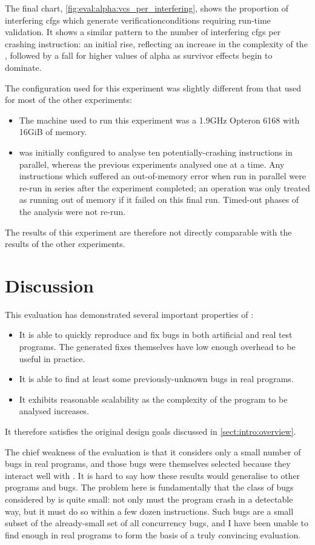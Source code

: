 The final chart, \autoref{fig:eval:alpha:vcs_per_interfering}, shows
the proportion of interfering \glspl{cfg} which generate
\glspl{verificationcondition} requiring run-time validation.  It shows
a similar pattern to the number of interfering \glspl{cfg} per
crashing instruction: an initial rise, reflecting an increase in the
complexity of the {\StateMachines}, followed by a fall for higher
values of \gls{alpha} as survivor effects begin to dominate.

The configuration used for this experiment was slightly different from
that used for most of the other experiments:
\begin{itemize}
\item The machine used to run this experiment was a 1.9GHz Opteron
  6168 with 16GiB of memory.
\item {\Implementation} was initially configured to analyse ten
  potentially-crashing instructions in parallel, whereas the previous
  experiments analysed one at a time.  Any instructions which suffered
  an out-of-memory error when run in parallel were re-run in series
  after the experiment completed; an operation was only treated as
  running out of memory if it failed on this final run.  Timed-out
  phases of the analysis were not re-run.
\end{itemize}
The results of this experiment are therefore not directly comparable
with the results of the other experiments.

\section{Discussion}

This evaluation has demonstrated several important properties of
{\technique}:
\begin{itemize}
\item It is able to quickly reproduce and fix bugs in both artificial
  and real test programs.  The generated fixes themselves have low
  enough overhead to be useful in practice.
\item It is able to find at least some previously-unknown bugs in real
  programs.
\item It exhibits reasonable scalability as the complexity of the
  program to be analysed increases.
\end{itemize}
It therefore satisfies the original design goals discussed in
\autoref{sect:intro:overview}.

The chief weakness of the evaluation is that it considers only a small
number of bugs in real programs, and those bugs were themselves
selected because they interact well with {\technique}.  It is hard to
say how these results would generalise to other programs and bugs.
The problem here is fundamentally that the class of bugs considered by
{\technique} is quite small: not only must the program crash in a
detectable way, but it must do so within a few dozen instructions.
Such bugs are a small subset of the already-small set of all
concurrency bugs, and I have been unable to find enough in real
programs to form the basis of a truly convincing evaluation.

